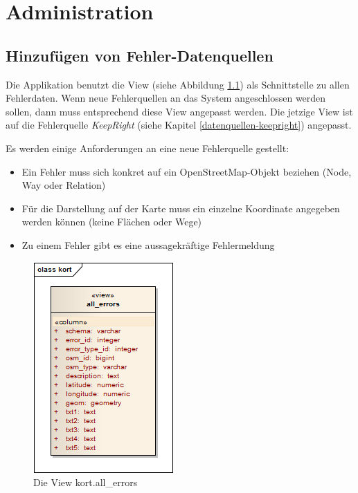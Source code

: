 \chapter{Administration}
\label{administration}

\section{Hinzufügen von Fehler-Datenquellen}
\label{additional-error-source}
Die Applikation benutzt die View  (siehe Abbildung \ref{image-kort-database-view-all_errors}) als Schnittstelle zu allen Fehlerdaten.
Wenn neue Fehlerquellen an das System angeschlossen werden sollen, dann muss entsprechend diese View angepasst werden.
Die jetzige View ist auf die Fehlerquelle \emph{KeepRight} (siehe Kapitel \ref{datenquellen-keepright}) angepasst.

Es werden einige Anforderungen an eine neue Fehlerquelle gestellt:
\begin{itemize}
\item Ein Fehler muss sich konkret auf ein \gls{OpenStreetMap}-Objekt beziehen (\gls{Node}, \gls{Way} oder \gls{Relation})
\item Für die Darstellung auf der Karte muss ein einzelne Koordinate angegeben werden können (keine Flächen oder Wege)
\item Zu einem Fehler gibt es eine aussagekräftige Fehlermeldung
\end{itemize}

\begin{figure}[H]
	\centering
	\includegraphics[scale=0.7]{images/uml/kort-database-view-all_errors}
	\caption{Die View kort.all\_errors}
	\label{image-kort-database-view-all_errors}
\end{figure}

